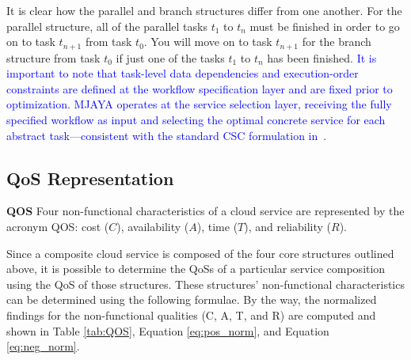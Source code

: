 \documentclass[3p,twocolumn]{elsarticle}
\theoremstyle{thmstyleone}%
\theoremstyle{thmstyletwo}%
\theoremstyle{thmstylethree}%
\begin{document}
It is clear how the parallel and branch structures differ from one another. For the parallel structure, all of the parallel tasks $t_1$ to $t_n$ must be finished in order to go on to task $t_{n+1}$ from task $t_0$. You will move on to task $t_{n+1}$ for the branch structure from task $t_0$ if just one of the tasks $t_1$ to $t_n$ has been finished. \textcolor{blue}{It is important to note that task-level data dependencies and execution-order constraints are defined at the workflow specification layer and are fixed prior to optimization. MJAYA operates at the service selection layer, receiving the fully specified workflow as input and selecting the optimal concrete service for each abstract task---consistent with the standard CSC formulation in~\cite{zeng2004qos, 
jatoth2019optimal}.}

\subsection{QoS Representation}

\textbf{QOS} Four non-functional characteristics of a cloud service are represented by the acronym QOS: cost ($C$), availability ($A$), time ($T$), and reliability ($R$).

Since a composite cloud service is composed of the four core structures outlined above, it is possible to determine the QoSs of a particular service composition using the QoS of those structures. These structures' non-functional characteristics can be determined using the following formulae. By the way, the normalized findings for the non-functional qualities (C, A, T, and R) are computed and shown in Table \ref{tab:QOS}, Equation \ref{eq:pos_norm}, and Equation \ref{eq:neg_norm}.
\end{document}
